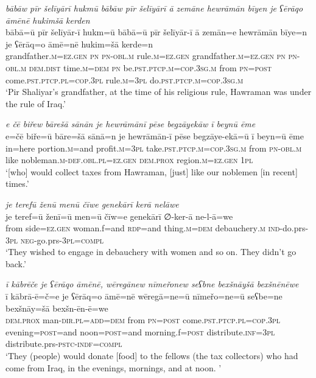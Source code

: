 \ea \label{BP.21}
\textit{bābāw pīr šelīyārī hukmū bābāw pīr šelīyārī ā zemāne hewrāmān bīyen je ʕērāqo āmēnē hukimšā kerden} \\ 
\gll bābā=ū pīr šelīyār-ī hukm=ū bābā=ū pīr šelīyār-ī ā zemān=e hewrāmān bīye=n je ʕērāq=o āmē=nē hukim=šā kerde=n \\ 
 grandfather\textsc{.m}\textsc{=ez.gen} \textsc{pn} \textsc{pn}\textsc{-obl}\textsc{.m} rule\textsc{.m}\textsc{=ez.gen} grandfather\textsc{.m}\textsc{=ez.gen} \textsc{pn} \textsc{pn}\textsc{-obl}\textsc{.m} \textsc{dem.dist} time\textsc{.m}\textsc{=dem} \textsc{pn} be\textsc{.pst}\textsc{.ptcp}\textsc{.m}\textsc{=cop}\textsc{.3sg}\textsc{.m} from \textsc{pn}\textsc{=\textsc{post}} come\textsc{.pst}\textsc{.ptcp}\textsc{.pl}\textsc{=cop}\textsc{.3pl} rule\textsc{.m}\textsc{=3pl} do\textsc{.pst}\textsc{.ptcp}\textsc{.m}\textsc{=cop}\textsc{.3sg}\textsc{.m} \\ 
\glt `Pir Shaliyar’s grandfather, at the time of his religious rule, Hawraman was under the rule of Iraq.'
\z 
 
\ea \label{BP.24}
\textit{e čē biřew bārešā sānān je hewrāmānī pēse begzāyekāw ī beynū ēme} \\ 
\gll e=čē biře=ū bāre=šā sānā=n je hewrāmān-ī pēse begzāye-ekā=ū ī beyn=ū ēme \\ 
 in=here portion\textsc{.m}=and profit\textsc{.m}\textsc{=3pl} take\textsc{.pst}\textsc{.ptcp}\textsc{.m}\textsc{=cop}\textsc{.3sg}\textsc{.m} from \textsc{pn}\textsc{-obl}\textsc{.m} like nobleman\textsc{.m}\textsc{-def}\textsc{.obl}\textsc{.pl}\textsc{=ez.gen} \textsc{dem.prox} region\textsc{.m}\textsc{=ez.gen} \textsc{1pl} \\ 
\glt `[who] would collect taxes from Hawraman, [just] like our noblemen [in recent] times.'
\z 
 
\ea \label{BP.36}
\textit{je terefū ženū menū čīwe genekārī kerā nelāwe} \\ 
\gll je teref=ū ženī=ū men=ū čīw=e genekārī ∅-ker-ā ne-l-ā=we \\ 
 from side\textsc{=ez.gen} woman.f=and \textsc{rdp}=and thing\textsc{.m}\textsc{=dem} debauchery\textsc{.m} \textsc{ind-}do.prs\textsc{-3pl} \textsc{neg-}go.prs\textsc{-3pl}\textsc{=compl} \\ 
\glt `They wished to engage in debauchery with women and so on. They didn’t go back.'
\z 
 
\ea \label{BP.38}
\textit{ī kābrēče je ʕērāqo āmēnē, wēregānew nīmeřonew seʕbne bexšnāyšā bexšnēnēwe} \\ 
\gll ī kābrā-ē=č=e je ʕērāq=o āmē=nē wēregā=ne=ū nīmeřo=ne=ū seʕbe=ne bexšnāy=šā bexšn-ēn-ē=we \\ 
 \textsc{dem.prox} man\textsc{-dir}\textsc{.pl}\textsc{=add}\textsc{=dem} from \textsc{pn}\textsc{=\textsc{post}} come\textsc{.pst}\textsc{.ptcp}\textsc{.pl}\textsc{=cop}\textsc{.3pl} evening\textsc{=\textsc{post}}=and noon\textsc{=\textsc{post}}=and morning.f\textsc{=\textsc{post}} distribute\textsc{.inf}\textsc{=3pl} distribute.prs\textsc{-pstc}\textsc{-indf}\textsc{=compl} \\ 
\glt `They (people) would donate [food] to the fellows (the tax collectors) who had come from Iraq, in the evenings, mornings, and at noon. '
\z 
 
